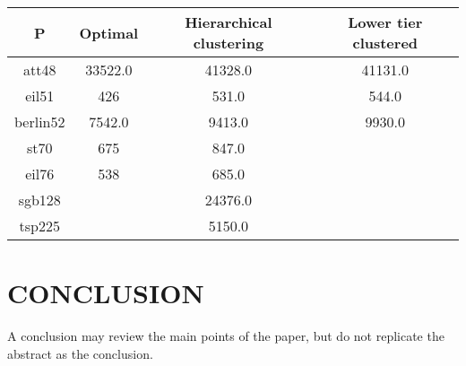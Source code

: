 \documentclass[10pt,twocolumn]{witseiepaper}
\begin{document}
\begin{table}[h]
	\begin{tabular}{| c | c | c | c |}
		\hline
		\textbf{P} & \textbf{Optimal} & \textbf{Hierarchical clustering} & \textbf{Lower tier clustered} \\
		\hline
		att48 & 33522.0 & 41328.0 & 41131.0\\
		eil51 & 426 & 531.0 & 544.0 \\
		berlin52 & 7542.0 & 9413.0 & 9930.0 \\
		st70 & 675 & 847.0 & \\
		eil76 & 538 & 685.0 & \\
		sgb128 &  & 24376.0 & \\
		tsp225 & & 5150.0 & \\
		\hline
	\end{tabular}
\end{table}




%
\section{CONCLUSION}

A conclusion may review the main points of the paper, but do not replicate the
abstract as the conclusion.


%


%



\end{document}
